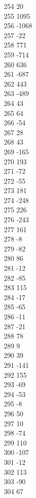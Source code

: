 { 254	20 \\
 255	1095 \\
 256	-1068 \\
 257	-22 \\
 258	771 \\
 259	-714 \\
 260	636 \\
 261	-687 \\
 262	443 \\
 263	-489 \\
 264	43 \\
 265	64 \\
 266	-54 \\
 267	28 \\
 268	43 \\
 269	-165 \\
 270	193 \\
 271	-72 \\
 272	-55 \\
 273	181 \\
 274	-248 \\
 275	226 \\
 276	-243 \\
 277	161 \\
 278	-8 \\
 279	-82 \\
 280	86 \\
 281	-12 \\
 282	-85 \\
 283	115 \\
 284	-17 \\
 285	-65 \\
 286	-11 \\
 287	-21 \\
 288	78 \\
 289	9 \\
 290	39 \\
 291	-141 \\
 292	155 \\
 293	-69 \\
 294	-53 \\
 295	-8 \\
 296	50 \\
 297	10 \\
 298	-74 \\
 299	110 \\
 300	-107 \\
 301	-12 \\
 302	113 \\
 303	-90 \\
 304	67 \\
}
